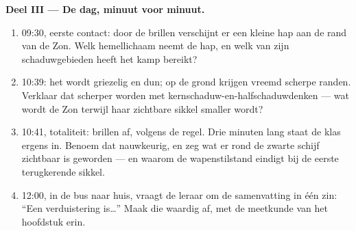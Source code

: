 \begin{problem}
\medskip\noindent\textbf{Deel III --- De dag, minuut voor minuut.}
\begin{enumerate}[resume]
  \item 09:30, eerste contact: door de brillen verschijnt er een
        kleine hap aan de rand van de Zon. Welk hemellichaam neemt de
        hap, en welk van zijn schaduwgebieden heeft het kamp bereikt?
  \item 10:39: het  wordt griezelig en dun;  op de
        grond krijgen vreemd scherpe randen. Verklaar dat scherper
        worden met kernschaduw-en-halfschaduwdenken --- wat wordt de
        Zon terwijl haar zichtbare sikkel smaller wordt?
  \item 10:41, totaliteit: brillen af, volgens de regel. Drie
        minuten lang staat de klas ergens in. Benoem dat nauwkeurig,
        en zeg wat er rond de zwarte schijf zichtbaar is geworden ---
        en waarom de wapenstilstand eindigt bij de eerste terugkerende
        sikkel.
  \item 12:00, in de bus naar huis, vraagt de leraar om de
        samenvatting in één zin: ``Een verduistering is\dots'' Maak
        die waardig af, met de meetkunde van het hoofdstuk erin.
\end{enumerate}
\end{problem}
